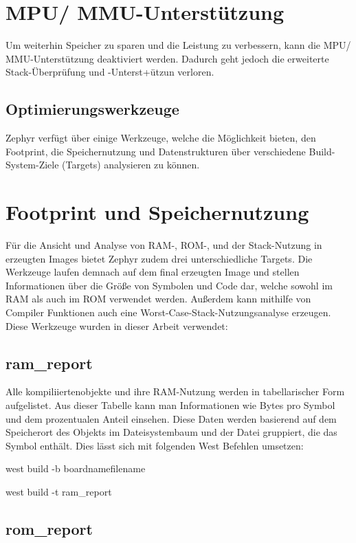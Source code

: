 \section{MPU/ MMU-Unterst{\"u}tzung}

Um weiterhin Speicher zu sparen und die Leistung zu verbessern, kann die MPU/ MMU-Unterst{\"u}tzung deaktiviert werden. Dadurch geht jedoch die erweiterte Stack-{\"U}berpr{\"u}fung und -Unterst+{\"u}tzun verloren.

\subsection{Optimierungswerkzeuge}

Zephyr verf{\"u}gt {\"u}ber einige Werkzeuge, welche die M{\"o}glichkeit bieten, den Footprint, die Speichernutzung und Datenstrukturen {\"u}ber verschiedene Build-System-Ziele (Targets) analysieren zu k{\"o}nnen.

\section{Footprint und Speichernutzung}

F{\"u}r die Ansicht und Analyse von RAM-, ROM-, und der Stack-Nutzung in erzeugten Images bietet Zephyr zudem drei unterschiedliche Targets. Die Werkzeuge laufen demnach auf dem final erzeugten Image und stellen Informationen {\"u}ber die Gr{\"o}{\ss}e von Symbolen und Code dar, welche sowohl im RAM als auch im ROM verwendet werden. Au{\ss}erdem kann mithilfe von Compiler Funktionen auch eine Worst-Case-Stack-Nutzungsanalyse erzeugen. Diese Werkzeuge wurden in dieser Arbeit verwendet:

\subsection{ram\_report}

Alle kompiliiertenobjekte und ihre RAM-Nutzung werden in tabellarischer Form aufgelistet. Aus dieser Tabelle kann man Informationen wie Bytes pro Symbol und dem prozentualen Anteil einsehen. Diese Daten werden basierend auf dem Speicherort des Objekts im Dateisystembaum und der Datei gruppiert, die das Symbol enth{\"a}lt. Dies l{\"a}sst sich mit folgenden West Befehlen umsetzen:

west build -b boardnamefilename

west build -t ram\_report

\subsection{rom\_report}

